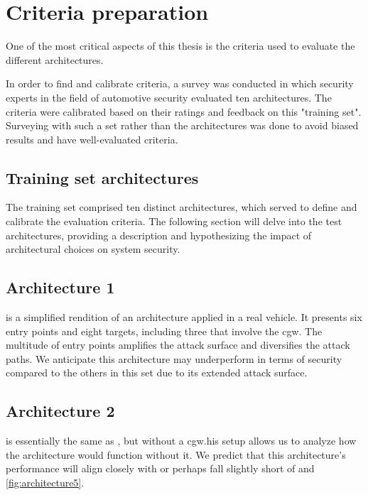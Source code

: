 \chapter{Criteria preparation}
\label{chp:introcriteria}

One of the most critical aspects of this thesis is the criteria used to evaluate the different architectures.

In order to find and calibrate criteria, a survey was conducted in which security experts in the field of automotive security evaluated ten architectures.
The criteria were calibrated based on their ratings and feedback on this "training set".
Surveying with such a set rather than the architectures was done to avoid biased results and have well-evaluated criteria.

\section{Training set architectures}
\label{sec:trainingarch}

The training set comprised ten distinct architectures, which served to define and calibrate the evaluation criteria. 
The following section will delve into the test architectures, 
providing a description and hypothesizing the impact of architectural choices on system security.

\section{Architecture 1}
\label{subsec:arch1}

 is a simplified rendition of an architecture applied in a real vehicle. 
It presents six entry points and eight targets, including three that involve the \acrshort{cgw}. 
The multitude of entry points amplifies the attack surface and diversifies the attack paths. 
We anticipate this architecture may underperform in terms of security compared to the others in this set due to its extended attack surface.

\section{Architecture 2}
\label{subsec:arch2}

 is essentially the same as , but without a \acrshort{cgw}.his setup allows us to analyze how the architecture would function without it. 
We predict that this architecture's performance will align closely with or perhaps fall slightly short of  and \ref{fig:architecture5}.

